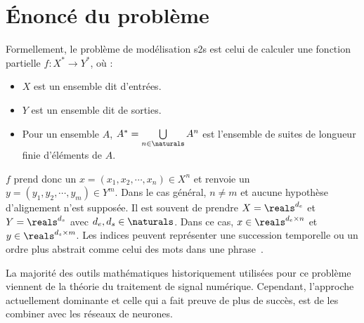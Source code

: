 \section{Énoncé du problème}
\label{sec.statement}

Formellement, le problème de modélisation \gls{s2s} est celui de calculer une fonction partielle
\(f: X^\ast \to Y^\ast\), où :
\begin{itemize}
    \item  \(X\) est un ensemble dit d'entrées. 
    \item \(Y\) est un ensemble dit de sorties.
    \item Pour un ensemble \(A\), \(A^\ast = \bigcup\limits_{n\in\naturals}A^n\)
    est l'ensemble de suites de longueur finie d'éléments de \(A\).
\end{itemize}
\(f\) prend donc un \(x = (x_1, x_2,\cdots, x_n)\in X^n\) 
et renvoie un \(y = (y_1, y_2,\cdots, y_m)\in Y^m\).
Dans le cas général, \(n\neq m\) et aucune hypothèse d'alignement n'est supposée.
Il est souvent de prendre \(X = \reals^{d_e}\) et \(Y = \reals^{d_s}\) avec \(d_e, d_s\in\naturals\).
Dans ce cas, 
\(x\in \reals^{d_e \times n}\) et \(y\in \reals^{d_s \times m}\).
Les indices peuvent représenter une succession temporelle 
ou un ordre plus abstrait comme celui des mots dans une phrase~\cite{Martins_2018}.

La majorité des outils mathématiques historiquement utilisées pour ce problème 
viennent de la théorie du traitement de signal numérique.
Cependant, l'approche actuellement dominante et celle qui a fait preuve de plus de succès,  
est de les combiner avec les réseaux de neurones.
